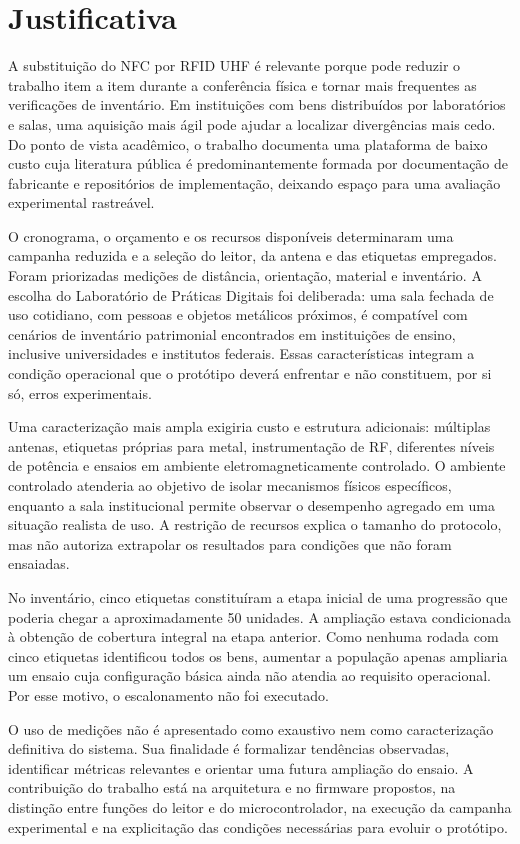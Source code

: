 \section{Justificativa}

A substituição do NFC por RFID UHF é relevante porque pode reduzir o trabalho item a item durante a conferência física e tornar mais frequentes as verificações de inventário. Em instituições com bens distribuídos por laboratórios e salas, uma aquisição mais ágil pode ajudar a localizar divergências mais cedo. Do ponto de vista acadêmico, o trabalho documenta uma plataforma de baixo custo cuja literatura pública é predominantemente formada por documentação de fabricante e repositórios de implementação, deixando espaço para uma avaliação experimental rastreável.

O cronograma, o orçamento e os recursos disponíveis determinaram uma campanha reduzida e a seleção do leitor, da antena e das etiquetas empregados. Foram priorizadas medições de distância, orientação, material e inventário. A escolha do Laboratório de Práticas Digitais foi deliberada: uma sala fechada de uso cotidiano, com pessoas e objetos metálicos próximos, é compatível com cenários de inventário patrimonial encontrados em instituições de ensino, inclusive universidades e institutos federais. Essas características integram a condição operacional que o protótipo deverá enfrentar e não constituem, por si só, erros experimentais.

Uma caracterização mais ampla exigiria custo e estrutura adicionais: múltiplas antenas, etiquetas próprias para metal, instrumentação de RF, diferentes níveis de potência e ensaios em ambiente eletromagneticamente controlado. O ambiente controlado atenderia ao objetivo de isolar mecanismos físicos específicos, enquanto a sala institucional permite observar o desempenho agregado em uma situação realista de uso. A restrição de recursos explica o tamanho do protocolo, mas não autoriza extrapolar os resultados para condições que não foram ensaiadas.

No inventário, cinco etiquetas constituíram a etapa inicial de uma progressão que poderia chegar a aproximadamente 50 unidades. A ampliação estava condicionada à obtenção de cobertura integral na etapa anterior. Como nenhuma rodada com cinco etiquetas identificou todos os bens, aumentar a população apenas ampliaria um ensaio cuja configuração básica ainda não atendia ao requisito operacional. Por esse motivo, o escalonamento não foi executado.

O uso de medições não é apresentado como exaustivo nem como caracterização definitiva do sistema. Sua finalidade é formalizar tendências observadas, identificar métricas relevantes e orientar uma futura ampliação do ensaio. A contribuição do trabalho está na arquitetura e no firmware propostos, na distinção entre funções do leitor e do microcontrolador, na execução da campanha experimental e na explicitação das condições necessárias para evoluir o protótipo.

